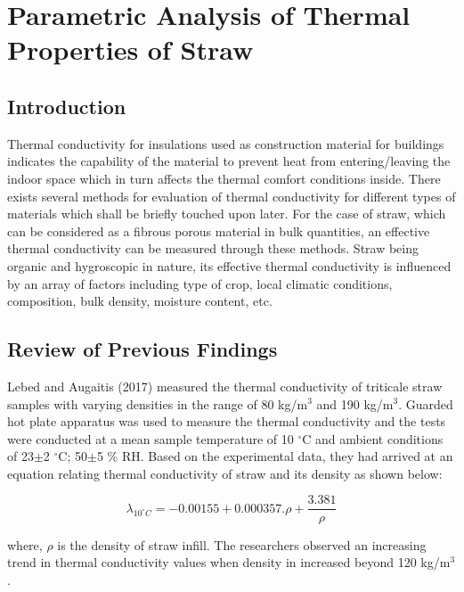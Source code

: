 \documentclass[12pt]{report}
\begin{document}

\chapter*{Parametric Analysis of Thermal Properties of Straw}

\section*{Introduction}

Thermal conductivity for insulations used as construction material for
buildings indicates the capability of the material to prevent heat from
entering/leaving the indoor space which in turn affects the thermal
comfort conditions inside. There exists several methods for evaluation
of thermal conductivity for different types of materials which shall be
briefly touched upon later. For the case of straw, which can be
considered as a fibrous porous material in bulk quantities, an effective
thermal conductivity can be measured through these methods. Straw being
organic and hygroscopic in nature, its effective thermal conductivity is
influenced by an array of factors including type of crop, local climatic
conditions, composition, bulk density, moisture content, etc.


\section*{Review of Previous Findings}


 Lebed and Augaitis (2017) measured the thermal conductivity of
triticale straw samples with varying densities in the range of 80
kg/m\(^{3}\) and 190 kg/m\( ^{3}\). Guarded hot plate apparatus was used
to measure the thermal conductivity and the tests were conducted at a
mean sample temperature of 10 \(^{\circ}\)C and ambient conditions of
23\(\pm\)2 \(^{\circ}\)C; 50\(\pm\)5 \% RH. Based on the experimental
data, they had arrived at an equation relating thermal conductivity of
straw and its density as shown below:

\[\lambda_{10^{\circ}C} = -0.00155 + 0.000357.\rho  + \frac{3.381}{\rho}\]

where, \(\rho\) is the density of straw infill. The researchers observed
an increasing trend in thermal conductivity values when density in
increased beyond 120 kg/m\(^{3}\).
\end{document}
